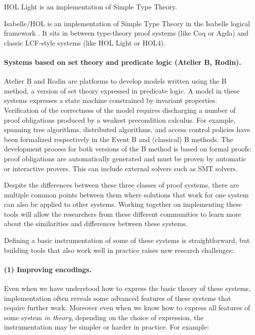 HOL Light is an implementation of Simple Type Theory.

Isabelle/HOL is an implementation of Simple Type Theory in the
Isabelle logical framework \cite{paulson700}. It sits in
between type-theory proof systems (like Coq or Agda) and classic
LCF-style systems (like HOL Light or HOL4).

\paragraph*{Systems based on set theory and predicate logic (Atelier B,  Rodin).}

Atelier B and Rodin are platforms to develop models written using the
B method, a version of set theory expressed in predicate logic.  A
model in these systems expresses a state machine constrained by
invariant properties. Verification of the correctness of the model
requires discharging a number of proof obligations produced by a
weakest precondition calculus. For example, spanning tree algorithms,
distributed algorithms, and access control policies have been
formalized respectively in the Event B and (classical) B methods.  The
development process for both versions of the B method is based on
formal proofs: proof obligations are automatically generated and must
be proven by automatic or interactive provers. This can include
external solvers such as SMT solvers.

\bigskip

Despite the differences between these three classes of proof systems,
there are multiple common points between them where solutions that work
for one system can also be applied to other systems. Working together
on implementing these tools will allow the researchers from these
different communities to learn more about the
similarities and differences between these systems.

Defining a basic instrumentation of some of these systems is
straightforward, but building tools that also work well in practice
raises new research challenges:

\paragraph*{(1) Improving encodings.}
Even when we have understood how to express the basic theory of these
systems, implementation often reveals some advanced features of these
systems that require further work.  Moreover even when we know how to
express all features of some system \emph{in theory}, depending on the
choice of expression, the instrumentation may be simpler or harder in
practice. For example:

